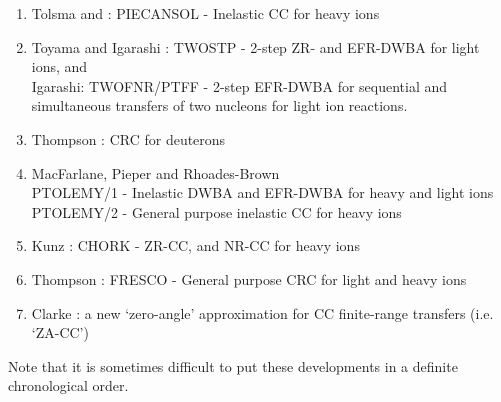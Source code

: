 \documentclass[11pt,a4paper]{article}
\begin{document}
\begin{enumerate}
\item Tolsma \cite{PIECAN} and \cite{TOLSMA2}:
PIECANSOL - Inelastic CC for heavy ions
\item Toyama and Igarashi \cite{TWOSTP}: TWOSTP - 2-step ZR- and EFR-DWBA for light ions, and
\\
Igarashi: TWOFNR/PTFF - 2-step EFR-DWBA for sequential and simultaneous
transfers of two nucleons for light ion reactions.
\item Thompson \cite{PHD}: CRC for deuterons
\item MacFarlane, Pieper and Rhoades-Brown \cite{ptolemy}\\
 PTOLEMY/1 - Inelastic DWBA and EFR-DWBA for heavy and light ions\\
 PTOLEMY/2 - General purpose inelastic CC for heavy ions
\item Kunz  : CHORK - ZR-CC, and NR-CC for heavy ions
\item Thompson \cite{FRESCO}: FRESCO - General purpose CRC for light
and heavy ions
\item Clarke \cite{ZAFRA}: a new `zero-angle' approximation for
CC finite-range transfers (i.e. `ZA-CC')
\end{enumerate}

Note that it is sometimes difficult to put these developments in a definite
chronological order.
\end{document}
